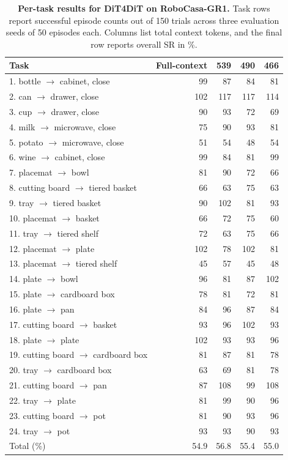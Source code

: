 \begin{table}[!tbp]
  \centering
  \caption{\textbf{Per-task results for DiT4DiT on RoboCasa-GR1.}
  Task rows report successful episode counts out of 150 trials across three evaluation seeds of 50 episodes each.
  Columns list total context tokens, and the final row reports overall SR in \%.
  }
  \label{tab:supp_pertask_gr1}
  \scriptsize
  \setlength{\tabcolsep}{3pt}
  \renewcommand{\arraystretch}{0.98}
\begin{tabular}{@{}lrrrr@{}}
    \toprule
    Task & Full-context & 539 & 490 & 466 \\
    \midrule
1. bottle $\rightarrow$ cabinet, close & 99 & 87 & 84 & 81 \\
2. can $\rightarrow$ drawer, close & 102 & 117 & 117 & 114 \\
3. cup $\rightarrow$ drawer, close & 90 & 93 & 72 & 69 \\
4. milk $\rightarrow$ microwave, close & 75 & 90 & 93 & 81 \\
5. potato $\rightarrow$ microwave, close & 51 & 54 & 48 & 54 \\
6. wine $\rightarrow$ cabinet, close & 99 & 84 & 81 & 99 \\
7. placemat $\rightarrow$ bowl & 81 & 90 & 72 & 66 \\
8. cutting board $\rightarrow$ tiered basket & 66 & 63 & 75 & 63 \\
9. tray $\rightarrow$ tiered basket & 90 & 102 & 81 & 93 \\
10. placemat $\rightarrow$ basket & 66 & 72 & 75 & 60 \\
11. tray $\rightarrow$ tiered shelf & 72 & 63 & 75 & 66 \\
12. placemat $\rightarrow$ plate & 102 & 78 & 102 & 81 \\
13. placemat $\rightarrow$ tiered shelf & 45 & 57 & 45 & 48 \\
14. plate $\rightarrow$ bowl & 96 & 81 & 87 & 102 \\
15. plate $\rightarrow$ cardboard box & 78 & 81 & 72 & 81 \\
16. plate $\rightarrow$ pan & 84 & 96 & 87 & 84 \\
17. cutting board $\rightarrow$ basket & 93 & 96 & 102 & 93 \\
18. plate $\rightarrow$ plate & 102 & 93 & 93 & 96 \\
19. cutting board $\rightarrow$ cardboard box & 81 & 87 & 81 & 78 \\
20. tray $\rightarrow$ cardboard box & 63 & 69 & 81 & 78 \\
21. cutting board $\rightarrow$ pan & 87 & 108 & 99 & 108 \\
22. tray $\rightarrow$ plate & 81 & 99 & 90 & 96 \\
23. cutting board $\rightarrow$ pot & 81 & 90 & 93 & 96 \\
24. tray $\rightarrow$ pot & 93 & 93 & 90 & 93 \\
    \midrule
    Total (\%) & 54.9 & 56.8 & 55.4 & 55.0 \\
    \bottomrule
  \end{tabular}
\end{table}
